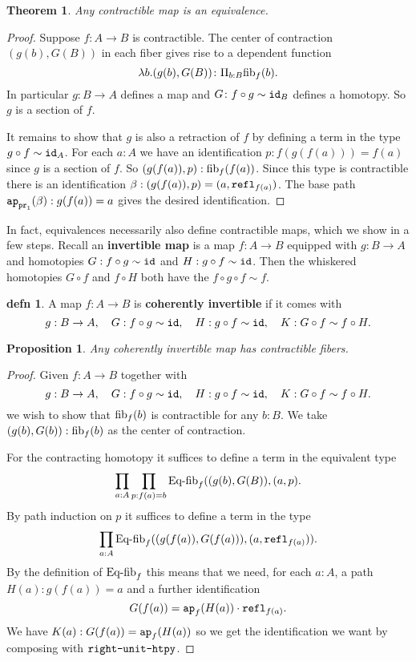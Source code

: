 \documentclass{amsart}
\theoremstyle{theorem}
\newtheorem*{thm}{Theorem}
\newtheorem*{prop}{Proposition}
\theoremstyle{definition}
\newtheorem*{defn}{defn}
\theoremstyle{remark}
\newcommand{\0}{\mathbbe{0}}
\newcommand{\1}{\mathbbe{1}}
\newcommand{\2}{\mathbbe{2}}
\newcommand{\3}{\mathbbe{3}}
\newcommand{\4}{\mathbbe{4}}
\newcommand{\term}[1]{{\textup{\texttt{#1}}}}
\newcommand{\type}[1]{{\textup{#1}}}
\newcommand{\id}{\term{id}}
\newcommand{\pr}{\term{pr}}
\newcommand{\refl}{\term{refl}}
\newcommand{\ap}{\term{ap}}
\newcommand{\fib}{\type{fib}}
\begin{document}
\begin{thm} Any contractible map is an equivalence.
\end{thm}
\begin{proof}
Suppose $f \colon A \to B$ is contractible. The center of contraction $(g(b),G(B))$ in each fiber gives rise to a dependent function
\[ \lambda b. (g(b),G(B)) \colon \Pi_{b:B} \fib_f(b).\]
In particular $g : B \to A$ defines a map and $G \colon f \circ g \sim \id_B$ defines a homotopy. So $g$ is a section of $f$.

It remains to show that $g$ is also a retraction of $f$ by defining a term in the type $g \circ f \sim \id_A$. For each $a : A$ we have an identification $p : f(g(f(a))) = f(a)$ since $g$ is a section of $f$. So $(g(f(a)),p) : \fib_f(f(a))$. Since this type is contractible there is an identification $\beta : (g(f(a)),p) = (a, \refl_{f(a)})$. The base path $\ap_{\pr_1}(\beta) : g(f(a)) = a$ gives the desired identification.
\end{proof}

In fact, equivalences necessarily also define contractible maps, which we show in a few steps. Recall an \textbf{invertible map} is a map $f \colon A \to B$ equipped with $g \colon B \to A$ and homotopies $G : f \circ g \sim \id$ and $H : g \circ f \sim \id$. Then the whiskered homotopies $G \circ f$ and $f \circ H$ both have the $f \circ g \circ f \sim f$.

\begin{defn} A map $f \colon A \to B$ is \textbf{coherently invertible} if it comes with
\[ g : B \to A, \quad G : f \circ g \sim \id, \quad H : g \circ f \sim \id, \quad K : G \circ f \sim f \circ H.\]
\end{defn}

\begin{prop} Any coherently invertible map has contractible fibers.
\end{prop}
\begin{proof}
Given $f \colon A \to B$ together with
\[ g : B \to A, \quad G : f \circ g \sim \id, \quad H : g \circ f \sim \id, \quad K : G \circ f \sim f \circ H.\]
we wish to show that $\fib_f(b)$ is contractible for any $b : B$. We take $(g(b), G(b)) : \fib_f(b)$ as the center of contraction. 

For the contracting homotopy it suffices to define a term in the equivalent type
\[ \prod_{a :A} \prod_{p : f(a) = b} \type{Eq-fib}_f((g(b),G(B)), (a,p).\]
By path induction on $p$ it suffices to define a term in the type
\[ \prod_{a :A} \type{Eq-fib}_f((g(f(a)),G(f(a))),(a, \refl_{f(a)})).\]
By the definition of $\type{Eq-fib}_f$ this means that we need, for each $a:A$, a path $H(a) : g(f(a))=a$ and a further identification
\[ G(f(a)) = \ap_f(H(a)) \cdot \refl_{f(a)}.\]
We have $K(a) : G(f(a)) = \ap_f(H(a))$ so we get the identification we want by composing with $\term{right-unit-htpy}$.\end{proof}
\end{document}
